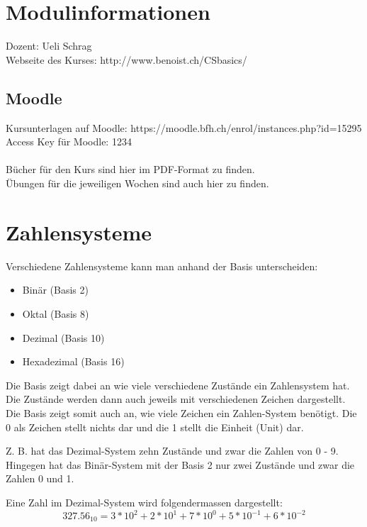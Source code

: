 \documentclass[12pt, a4paper, oneside]{article}
\title{\vspace{-1.5cm}\subjectIdentifier{}\\\subject{}}
\author{\vspace{-1.5cm}}
\date{\vspace{-1.5cm}}
\begin{document}
\maketitle
\thispagestyle{fancy}

\section{Modulinformationen} 
Dozent: Ueli Schrag \\
Webseite des Kurses: http://www.benoist.ch/CSbasics/
\subsection{Moodle}
Kursunterlagen auf Moodle: https://moodle.bfh.ch/enrol/instances.php?id=15295 \\
Access Key für Moodle: 1234\\\\
Bücher für den Kurs sind hier im PDF-Format zu finden.\\
Übungen für die jeweiligen Wochen sind auch hier zu finden.

\section{Zahlensysteme}
Verschiedene Zahlensysteme kann man anhand der Basis unterscheiden:
\begin{itemize}
  \item Binär (Basis 2)
  \item Oktal (Basis 8)
  \item Dezimal (Basis 10)
  \item Hexadezimal (Basis 16)
\end{itemize}
Die Basis zeigt dabei an wie viele verschiedene Zustände ein Zahlensystem hat. Die Zustände werden dann auch jeweils mit verschiedenen Zeichen dargestellt. Die Basis zeigt somit auch an, wie viele Zeichen ein Zahlen-System benötigt. Die 0 als Zeichen stellt nichts dar und die 1 stellt die Einheit (Unit) dar.

Z. B. hat das Dezimal-System zehn Zustände und zwar die Zahlen von 0 - 9. Hingegen hat das Binär-System mit der Basis 2 nur zwei Zustände und zwar die Zahlen 0 und 1.

Eine Zahl im Dezimal-System wird folgendermassen dargestellt:
\begin{equation}
  327.56_{10} = 3 * 10^2 + 2 * 10^1 + 7 * 10^0 + 5 * 10^{-1} + 6 * 10^{-2}
\end{equation}
\end{document}
